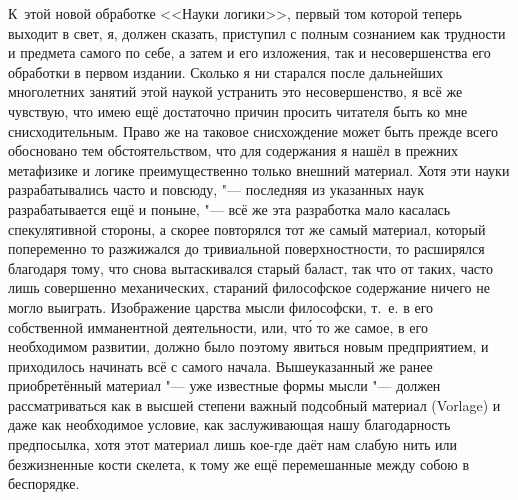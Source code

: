К~этой новой обработке <<Науки логики>>, первый том которой теперь выходит в
свет, я, должен сказать, приступил с полным сознанием как трудности и предмета
самого по себе, а затем и его изложения, так и несовершенства его обработки в
первом издании. Сколько я ни старался после дальнейших многолетних занятий этой
наукой устранить это несовершенство, я всё же чувствую, что имею ещё достаточно
причин просить читателя быть ко мне снисходительным. Право же на таковое
снисхождение может быть прежде всего обосновано тем обстоятельством, что для
содержания я нашёл в прежних метафизике и логике преимущественно только внешний
материал. Хотя эти науки разрабатывались часто и повсюду, "--- последняя из
указанных наук разрабатывается ещё и поныне, "--- всё же эта разработка мало
касалась спекулятивной стороны, а скорее повторялся тот же самый материал,
который попеременно то разжижался до тривиальной поверхностности, то расширялся
благодаря тому, что снова вытаскивался старый баласт, так что от таких, часто
лишь совершенно механических, стараний философское содержание ничего не могло
выиграть. Изображение царства мысли философски, т.~е. в его собственной
имманентной деятельности, или, чт\'{о} то же самое, в его необходимом развитии,
должно было поэтому явиться новым предприятием, и приходилось начинать всё с
самого начала. Вышеуказанный же ранее приобретённый материал "--- уже известные
формы мысли "--- должен рассматриваться как в высшей степени важный подсобный
материал (Vorlage) и даже как необходимое условие, как заслуживающая нашу
благодарность предпосылка, хотя этот материал лишь кое-где даёт нам слабую нить
или безжизненные кости скелета, к тому же ещё перемешанные между собою в
беспорядке.

